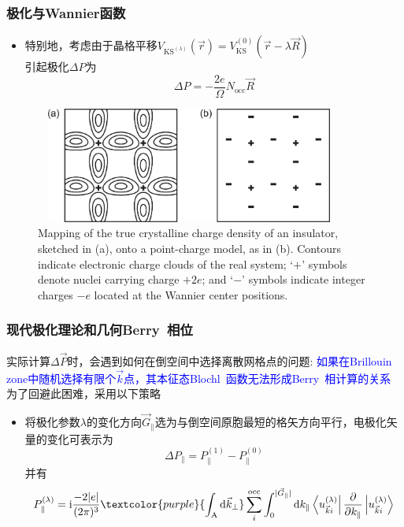 {\frame
{
	\frametitle{极化与\textrm{Wannier}函数}
	\begin{itemize}
		\item 特别地，考虑由于晶格平移$V_{\mathrm{KS}^{(\lambda)}}(\vec r)=V_{\mathrm{KS}}^{(0)}(\vec r-\lambda\vec R)$\\
			引起极化$\Delta P$为
			\begin{displaymath}
				\Delta P=-\frac{2e}{\Omega}N_{\mathrm{occ}}\vec R
			\end{displaymath}
	\end{itemize}
\begin{figure}[h!]
\centering
\vspace*{-0.12in}
\includegraphics[height=1.5in,width=4.0in,viewport=0 0 1500 640,clip]{Figures/Mapping-of-the-true-crystalline-charge-density-of-an-insulator.png}
\caption{\tiny \textrm{Mapping of the true crystalline charge density of an insulator, sketched in (a), onto a point-charge model, as in (b). Contours indicate electronic charge clouds of the real system; ‘$+$’ symbols denote nuclei carrying charge $+2e$; and ‘$−$’ symbols indicate integer charges $−e$ located at the Wannier center positions.}}%
\label{Polizarized-Berry_Wannier}
\end{figure} 
}

\frame
{
	\frametitle{现代极化理论和几何\textrm{Berry~}相位}
	实际计算$\Delta\vec P$时，会遇到如何在倒空间中选择离散网格点的问题:
	\vskip 5pt
	\textcolor{blue}{如果在\textrm{Brillouin zone}中随机选择有限个$\vec k$点，其本征态\textrm{Blochl~}函数无法形成\textrm{Berry~}相计算的关系} 
	\vskip 5pt
	为了回避此困难，采用以下策略
	\begin{itemize}
		\item 将极化参数$\lambda$的变化方向$\vec G_{\lVert}$选为与倒空间原胞最短的格矢方向平行，电极化矢量的变化可表示为
			\begin{displaymath}
				\Delta P_{\lVert}=P_{\lVert}^{(1)}-P_{\lVert}^{(0)}
			\end{displaymath}
			并有
			\begin{displaymath}
				P_{\lVert}^{(\lambda)}=\mathrm{i}\frac{-2|e|}{(2\pi)^3}\textcolor{purple}{\int_{\mathrm{A}}\mathrm{d}\vec k_{\bot}}\sum_i^{\mathrm{occ}}\int_0^{|\vec G_{\lVert}|}\mathrm{d}k_{\lVert}\left\langle u_{\vec k i}^{(\lambda)}\right|\frac{\partial}{\partial k_{\lVert}}\left|u_{\vec k i}^{(\lambda)}\right\rangle
			\end{displaymath}


\end{itemize}}}
